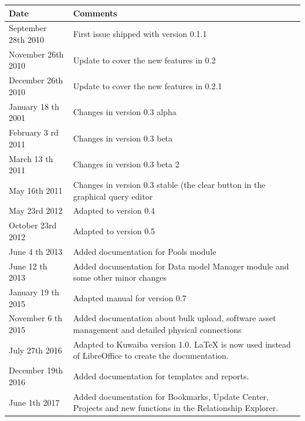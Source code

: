 \documentclass[a4paper]{article}
\begin{document}
		\begin{table}[h!]
			\centering
			\begin{tabular}{l||p{10cm}} %
				\toprule
				\textbf{Date} & \textbf{Comments}  \\
				\midrule
				September 28th 2010 & First issue shipped with version 0.1.1\\
				\midrule
				November 26th 2010 & Update to cover the new features in 0.2 \\
				\midrule
				December 26th 2010 & Update to cover the new features in 0.2.1 \\
				\midrule
				January 18 th 2001 & Changes in version 0.3 alpha \\
				\midrule
				February 3 rd 2011 & Changes in version 0.3 beta \\
				\midrule
				March 13 th	2011 & Changes in version 0.3 beta 2 \\
				\midrule
				May 16th 2011 & Changes in version 0.3 stable (the clear button in the graphical query editor \\
				\midrule
				May 23rd 2012 & Adapted to version 0.4 \\
				\midrule
				October 23rd 2012 & Adapted to version 0.5 \\
				\midrule
				June 4 th 2013 & Added documentation	for Pools module \\
				\midrule
				June 12 th 2013 & Added documentation for Data model Manager module and some other minor changes\\
				\midrule
				January 19 th 2015 & Adapted manual for version 0.7 \\
				\midrule
				November 6 th 2015 & Added documentation about bulk upload, software asset management and detailed physical connections \\
				\midrule
				July 27th 2016 & Adapted to Kuwaiba version 1.0. LaTeX is now used instead of LibreOffice to create the documentation. \\
				\midrule
				December 19th 2016 & Added documentation for templates and reports.\\
				\midrule
				June 1th 2017 & Added documentation for Bookmarks, Update Center, Projects and new functions in the Relationship Explorer.\\
				\bottomrule
			\end{tabular}	
				
		\end{table}
	\newpage
\end{document}
